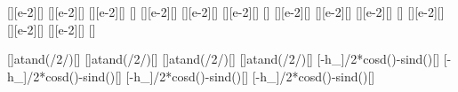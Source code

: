 [\cm][e-2][\meter]
[\cm][e-2][\meter]
[\cm][e-2][\meter]
[\degree]
[\cm][e-2][\meter]
[\cm][e-2][\meter]
[\cm][e-2][\meter]
[\degree]
[\cm][e-2][\meter]
[\cm][e-2][\meter]
[\cm][e-2][\meter]
[\degree]
[\cm][e-2][\meter]
[\cm][e-2][\meter]
[\cm][e-2][\meter]
[\degree]

[\arctan{}]{atand(\wAX/2/\sAX)}[\degree]
[\arctan{}]{atand(\wBX/2/\sBX)}[\degree]
[\arctan{}]{atand(\wCX/2/\sCX)}[\degree]
[\arctan{}]{atand(\wDX/2/\sDX)}[\degree]
[\cos\theta-h_\sin\theta]{\wAX/2*cosd(\tAX)-\sAX*sind(\tAX)}[\meter]
[\cos\theta-h_\sin\theta]{\wBX/2*cosd(\tBX)-\sBX*sind(\tBX)}[\meter]
[\cos\theta-h_\sin\theta]{\wCX/2*cosd(\tCX)-\sCX*sind(\tCX)}[\meter]
[\cos\theta-h_\sin\theta]{\wDX/2*cosd(\tDX)-\sDX*sind(\tDX)}[\meter]
